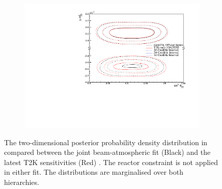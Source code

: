 \begin{figure}[h]
  \begin{subfigure}[t]{0.98\textwidth}
    \includegraphics[width=\textwidth, trim={0mm 0mm 0mm 0mm}, clip,page=1]{Figures/OA/JointFit_OA2020_Comp/ContourComparison_2D_th23_dm32_BH_1_woRC_UnSmeared_CredibleInterval.pdf}
  \end{subfigure}
  \caption{The two-dimensional posterior probability density distribution in  compared between the joint beam-atmospheric fit (Black) and the latest T2K sensitivities (Red) \cite{t2k_tn_399}. The reactor constraint is not applied in either fit. The distributions are marginalised over both hierarchies.}
  \label{fig:OscillationAnalysis_JointFit_OA2020_DM32TH23}
\end{figure}

